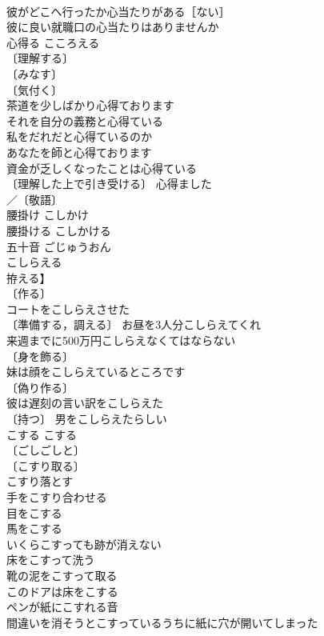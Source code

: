 \documentclass[8pt]{extreport}
\begin{document}
\begin{CJK}{UTF8}{min}
\\	彼がどこへ行ったか心当たりがある［ない］ 
\\	彼に良い就職口の心当たりはありませんか 
\\	心得る	こころえる	
\\	〔理解する〕
\\	〔みなす〕
\\	〔気付く〕
\\	茶道を少しばかり心得ております 
\\	それを自分の義務と心得ている 
\\	私をだれだと心得ているのか 
\\	あなたを師と心得ております 
\\	資金が乏しくなったことは心得ている 
\\	〔理解した上で引き受ける〕 心得ました 
\\	／〔敬語〕
\\	腰掛け	こしかけ	
\\	腰掛ける	こしかける	
\\	五十音	ごじゅうおん	
\\	こしらえる	
\\	拵える】	
\\	〔作る〕
\\	コートをこしらえさせた 
\\	〔準備する，調える〕 お昼を3人分こしらえてくれ 
\\	来週までに500万円こしらえなくてはならない 
\\	〔身を飾る〕
\\	妹は顔をこしらえているところです 
\\	〔偽り作る〕
\\	彼は遅刻の言い訳をこしらえた 
\\	〔持つ〕 男をこしらえたらしい 
\\	こする	こする	
\\	〔ごしごしと〕
\\	〔こすり取る〕
\\	こすり落とす 
\\	手をこすり合わせる 
\\	目をこする 
\\	馬をこする 
\\	いくらこすっても跡が消えない 
\\	床をこすって洗う 
\\	靴の泥をこすって取る 
\\	このドアは床をこする 
\\	ペンが紙にこすれる音 
\\	間違いを消そうとこすっているうちに紙に穴が開いてしまった 

\end{CJK}
\end{document}
